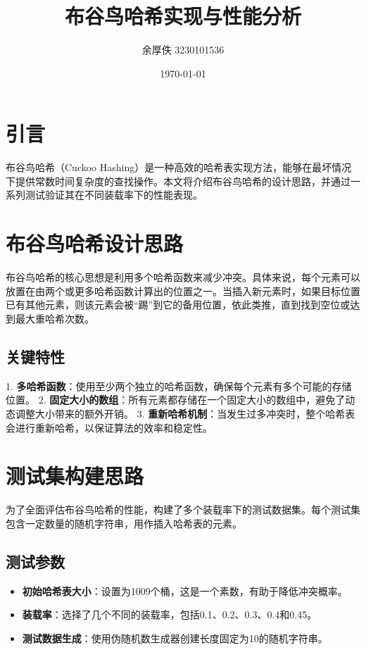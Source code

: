\documentclass{article}
\title{布谷鸟哈希实现与性能分析}
\author{余厚佚 3230101536}
\date{\today}
\begin{document}
    \maketitle

    \section{引言}
    布谷鸟哈希（Cuckoo Hashing）是一种高效的哈希表实现方法，能够在最坏情况下提供常数时间复杂度的查找操作。本文将介绍布谷鸟哈希的设计思路，并通过一系列测试验证其在不同装载率下的性能表现。

    \section{布谷鸟哈希设计思路}
    布谷鸟哈希的核心思想是利用多个哈希函数来减少冲突。具体来说，每个元素可以放置在由两个或更多哈希函数计算出的位置之一。当插入新元素时，如果目标位置已有其他元素，则该元素会被“踢”到它的备用位置，依此类推，直到找到空位或达到最大重哈希次数。

    \subsection{关键特性}
    1. \textbf{多哈希函数}：使用至少两个独立的哈希函数，确保每个元素有多个可能的存储位置。
    2. \textbf{固定大小的数组}：所有元素都存储在一个固定大小的数组中，避免了动态调整大小带来的额外开销。
    3. \textbf{重新哈希机制}：当发生过多冲突时，整个哈希表会进行重新哈希，以保证算法的效率和稳定性。

    \section{测试集构建思路}
    为了全面评估布谷鸟哈希的性能，构建了多个装载率下的测试数据集。每个测试集包含一定数量的随机字符串，用作插入哈希表的元素。

    \subsection{测试参数}
    \begin{itemize}
        \item \textbf{初始哈希表大小}：设置为1009个桶，这是一个素数，有助于降低冲突概率。
        \item \textbf{装载率}：选择了几个不同的装载率，包括0.1、0.2、0.3、0.4和0.45。
        \item \textbf{测试数据生成}：使用伪随机数生成器创建长度固定为10的随机字符串。
    \end{itemize}
\end{document}
